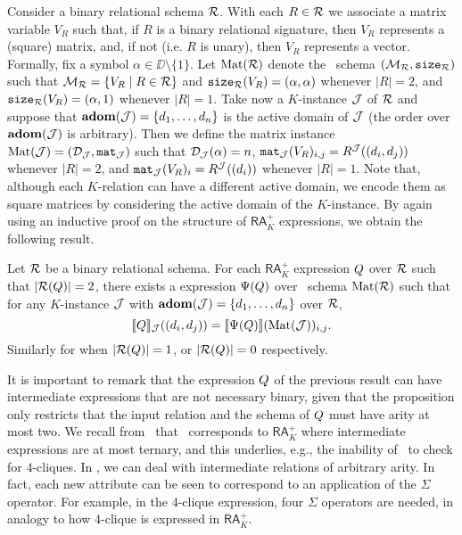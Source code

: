 Consider a binary relational schema $\mathcal{R}$. With each $R\in \mathcal{R}$ we associate a matrix variable $V_R$ such that, if $R$ is a binary relational signature, then $V_R$ represents a (square) matrix, and, if not (i.e. $R$ is unary), then $V_R$ represents a vector. Formally, fix a symbol $\alpha \in \DD \setminus \{1\}$. Let $\text{Mat}(\mathcal{R})$ denote the \lang \ schema
$(\mathcal{M}_{\mathcal{R}},\texttt{size}_{\mathcal{R}})$ such that $\mathcal{M}_{\mathcal{R}} = \{ V_R \mid R \in \mathcal{R}\}$ and $\texttt{size}_{\mathcal{R}}(V_R) = (\alpha, \alpha)$ whenever $|R| = 2$, and $\texttt{size}_{\mathcal{R}}(V_R) = (\alpha, 1)$ whenever $|R|=1$. 
Take now a $K$-instance $\mathcal{J}$ of $\mathcal{R}$ and suppose that $\mathbf{adom}(\mathcal{J}) = \{d_1, \ldots, d_n\}$ is the active domain of $\mathcal{J}$ (the order over $\mathbf{adom}(\mathcal{J})$ is arbitrary). Then we define the matrix instance $\text{Mat}(\mathcal{J}) = (\mathcal{D}_{\mathcal{J}},\texttt{mat}_{\mathcal{J}})$ such that $\mathcal{D}_{\mathcal{J}}(\alpha) = n$, $\texttt{mat}_{\mathcal{J}}(V_R)_{i,j} = R^{\mathcal{J}}((d_i, d_j))$ whenever $|R|=2$, and $\texttt{mat}_{\mathcal{J}}(V_R)_{i} = R^{\mathcal{J}}((d_i))$ whenever $|R|=1$. 
Note that, although each $K$-relation can have a different active domain, we encode them as square matrices by considering the active domain of the $K$-instance. By again using an inductive proof on the structure of 
$\mathsf{RA}_{K}^+$ expressions, we obtain the following result.
\begin{proposition}\label{prop:ara_to_sum} 
	Let $\mathcal{R}$ be a binary relational schema. For each $\mathsf{RA}_{K}^+$  expression $Q$ over $\mathcal{R}$  such that $|\mathcal{R}(Q)| = 2$, there exists a \langsum  expression $\Psi(Q)$ over \lang \ schema $\text{Mat}(\mathcal{R})$ such that for any $K$-instance $\mathcal{J}$ with $\mathbf{adom}(\mathcal{J}) = \{d_1, \ldots, d_n\}$ over $\mathcal{R}$,
	$$
	\llbracket Q \rrbracket_{\mathcal{J}}((d_i, d_j))=\llbracket \Psi(Q) \rrbracket(\text{Mat}(\mathcal{J}))_{i,j}.
	$$
	Similarly for when $|\mathcal{R}(Q)| = 1$, or $|\mathcal{R}(Q)| = 0$ respectively.
\end{proposition} 

It is important to remark that the expression $Q$ of the previous result can have intermediate expressions that are not necessary binary, given that the proposition only restricts that the input relation and the schema of $Q$ must have arity at most two. We recall from~\cite{brijder2019matrices} that \lang\ corresponds to $\mathsf{RA}_{K}^+$ where intermediate expressions are at most ternary, and this underlies, e.g., the inability of \lang\ to check for $4$-cliques. In \langsum, we can deal with intermediate relations of arbitrary arity. In fact, each new attribute can be seen to correspond to an application of the $\Sigma$ operator. For example, in the $4$-clique expression, four $\Sigma$ operators are needed, in analogy to how
$4$-clique is expressed in $\mathsf{RA}_{K}^+$.

